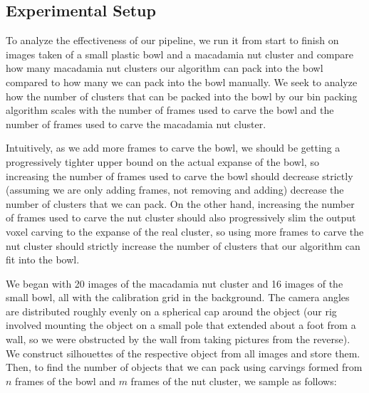 \documentclass[10pt,twocolumn,letterpaper]{article}
\begin{document}
\subsection{Experimental Setup}

To analyze the effectiveness of our pipeline, we run it from start to finish on images taken of a small plastic bowl and a macadamia nut cluster and compare how many macadamia nut clusters our algorithm can pack into the bowl compared to how many we can pack into the bowl manually. We seek to analyze how the number of clusters that can be packed into the bowl by our bin packing algorithm scales with the number of frames used to carve the bowl and the number of frames used to carve the macadamia nut cluster. 

Intuitively, as we add more frames to carve the bowl, we should be getting a progressively tighter upper bound on the actual expanse of the bowl, so increasing the number of frames used to carve the bowl should decrease strictly (assuming we are only adding frames, not removing and adding) decrease the number of clusters that we can pack. On the other hand, increasing the number of frames used to carve the nut cluster should also progressively slim the output voxel carving to the expanse of the real cluster, so using more frames to carve the nut cluster should strictly increase the number of clusters that our algorithm can fit into the bowl.

We began with 20 images of the macadamia nut cluster and 16 images of the small bowl, all with the calibration grid in the background. The camera angles are distributed roughly evenly on a spherical cap around the object (our rig involved mounting the object on a small pole that extended about a foot from a wall, so we were obstructed by the wall from taking pictures from the reverse). We construct silhouettes of the respective object from all images and store them. Then, to find the number of objects that we can pack using carvings formed from $n$ frames of the bowl and $m$ frames of the nut cluster, we sample as follows:
\end{document}
